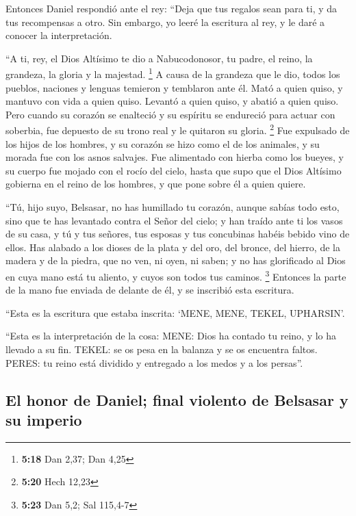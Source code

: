 \begin{paracol}{2}
 Entonces Daniel respondió ante el rey: ``Deja que tus
regalos sean para ti, y da tus recompensas a otro. Sin embargo, yo leeré
la escritura al rey, y le daré a conocer la interpretación.

 ``A ti, rey, el Dios Altísimo te dio a Nabucodonosor, tu
padre, el reino, la grandeza, la gloria y la majestad. \footnote{\textbf{5:18}
  Dan 2,37; Dan 4,25}  A causa de la grandeza que le dio,
todos los pueblos, naciones y lenguas temieron y temblaron ante él. Mató
a quien quiso, y mantuvo con vida a quien quiso. Levantó a quien quiso,
y abatió a quien quiso.  Pero cuando su corazón se
enalteció y su espíritu se endureció para actuar con soberbia, fue
depuesto de su trono real y le quitaron su gloria. \footnote{\textbf{5:20}
  Hech 12,23}  Fue expulsado de los hijos de los hombres,
y su corazón se hizo como el de los animales, y su morada fue con los
asnos salvajes. Fue alimentado con hierba como los bueyes, y su cuerpo
fue mojado con el rocío del cielo, hasta que supo que el Dios Altísimo
gobierna en el reino de los hombres, y que pone sobre él a quien quiere.

 ``Tú, hijo suyo, Belsasar, no has humillado tu corazón,
aunque sabías todo esto,  sino que te has levantado
contra el Señor del cielo; y han traído ante ti los vasos de su casa, y
tú y tus señores, tus esposas y tus concubinas habéis bebido vino de
ellos. Has alabado a los dioses de la plata y del oro, del bronce, del
hierro, de la madera y de la piedra, que no ven, ni oyen, ni saben; y no
has glorificado al Dios en cuya mano está tu aliento, y cuyos son todos
tus caminos. \footnote{\textbf{5:23} Dan 5,2; Sal 115,4-7}
 Entonces la parte de la mano fue enviada de delante de
él, y se inscribió esta escritura.

 ``Esta es la escritura que estaba inscrita: `MENE, MENE,
TEKEL, UPHARSIN'.

 ``Esta es la interpretación de la cosa: MENE: Dios ha
contado tu reino, y lo ha llevado a su fin.  TEKEL: se os
pesa en la balanza y se os encuentra faltos.  PERES: tu
reino está dividido y entregado a los medos y a los persas''.

\hypertarget{el-honor-de-daniel-final-violento-de-belsasar-y-su-imperio}{%
\subsection{El honor de Daniel; final violento de Belsasar y su
imperio}\label{el-honor-de-daniel-final-violento-de-belsasar-y-su-imperio}}


\end{paracol}

